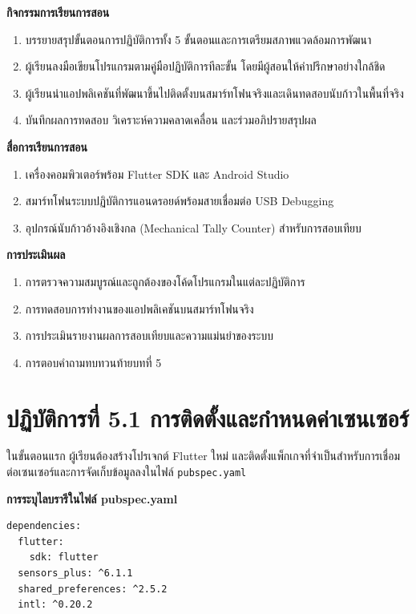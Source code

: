 \noindent\textbf{กิจกรรมการเรียนการสอน}
\begin{enumerate}
    \item บรรยายสรุปขั้นตอนการปฏิบัติการทั้ง 5 ขั้นตอนและการเตรียมสภาพแวดล้อมการพัฒนา
    \item ผู้เรียนลงมือเขียนโปรแกรมตามคู่มือปฏิบัติการทีละขั้น โดยมีผู้สอนให้คำปรึกษาอย่างใกล้ชิด
    \item ผู้เรียนนำแอปพลิเคชันที่พัฒนาขึ้นไปติดตั้งบนสมาร์ทโฟนจริงและเดินทดสอบนับก้าวในพื้นที่จริง
    \item บันทึกผลการทดสอบ วิเคราะห์ความคลาดเคลื่อน และร่วมอภิปรายสรุปผล
\end{enumerate}

\noindent\textbf{สื่อการเรียนการสอน}
\begin{enumerate}
    \item เครื่องคอมพิวเตอร์พร้อม Flutter SDK และ Android Studio
    \item สมาร์ทโฟนระบบปฏิบัติการแอนดรอยด์พร้อมสายเชื่อมต่อ USB Debugging
    \item อุปกรณ์นับก้าวอ้างอิงเชิงกล (Mechanical Tally Counter) สำหรับการสอบเทียบ
\end{enumerate}

\noindent\textbf{การประเมินผล}
\begin{enumerate}
    \item การตรวจความสมบูรณ์และถูกต้องของโค้ดโปรแกรมในแต่ละปฏิบัติการ
    \item การทดสอบการทำงานของแอปพลิเคชันบนสมาร์ทโฟนจริง
    \item การประเมินรายงานผลการสอบเทียบและความแม่นยำของระบบ
    \item การตอบคำถามทบทวนท้ายบทที่ 5
\end{enumerate}

\newpage

\section{ปฏิบัติการที่ 5.1 การติดตั้งและกำหนดค่าเซนเซอร์}
ในขั้นตอนแรก ผู้เรียนต้องสร้างโปรเจกต์ Flutter ใหม่ และติดตั้งแพ็กเกจที่จำเป็นสำหรับการเชื่อมต่อเซนเซอร์และการจัดเก็บข้อมูลลงในไฟล์ \texttt{pubspec.yaml}

\begin{codebox}
\textbf{การระบุไลบรารีในไฟล์ pubspec.yaml}
\begin{lstlisting}
dependencies:
  flutter:
    sdk: flutter
  sensors_plus: ^6.1.1
  shared_preferences: ^2.5.2
  intl: ^0.20.2
\end{lstlisting}
\end{codebox}

